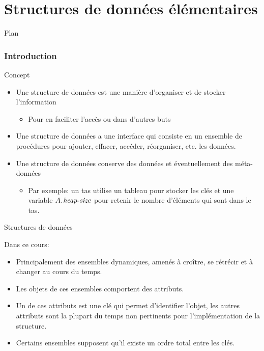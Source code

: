 
\part{Structures de données élémentaires}


\begin{frame}{Plan}

\tableofcontents

\end{frame}

\section{Introduction}

\begin{frame}{Concept}
\begin{itemize}
\item Une \alert{structure de données} est une manière d'organiser et de stocker l'information
\begin{itemize}
\item Pour en faciliter l'accès ou dans d'autres buts
\end{itemize}
\item Une structure de données a une \alert{interface} qui consiste en un ensemble de procédures pour ajouter, effacer, accéder, réorganiser, etc. les données.
\item Une structure de données conserve des \alert{données} et éventuellement des \alert{méta-données}
\begin{itemize}
\item Par exemple: un tas utilise un tableau pour stocker les clés et une variable $\attrib{A}{heap-size}$ pour retenir le nombre d'éléments qui sont dans le tas.
\end{itemize}
\end{itemize}
\end{frame}

\begin{frame}{Structures de données}

Dans ce cours:
\begin{itemize}
\item Principalement des \alert{ensembles dynamiques}, amenés à croître, se
  rétrécir et à changer au cours du temps.
\item Les objets de ces ensembles comportent des attributs.
\item Un de ces attributs est une \alert{clé} qui permet d'identifier
  l'objet, les autres attributs sont la plupart du temps non
  pertinents pour l'implémentation de la structure.
\item Certains ensembles supposent qu'il existe un \alert{ordre total}
  entre les clés.
\end{itemize}

\end{frame}

